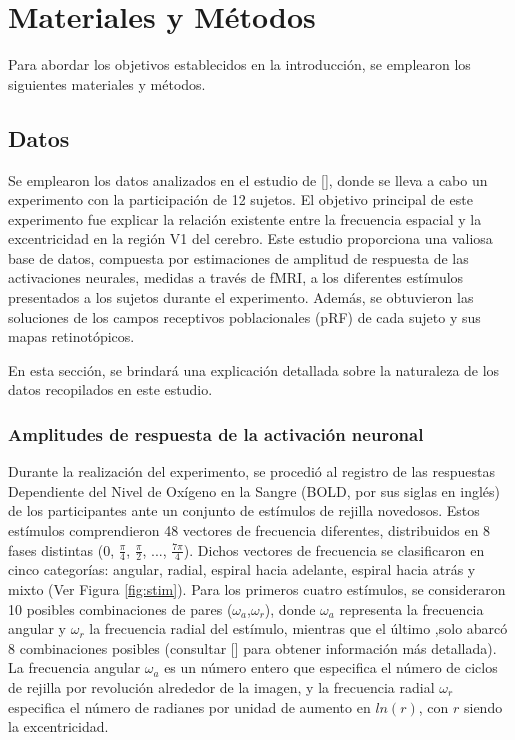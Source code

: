 \chapter{Materiales y M\'etodos}\label{chapter:materials_and_methods}

Para abordar los objetivos establecidos en la introducción, se emplearon los siguientes materiales y métodos.

\section{Datos}

Se emplearon los datos analizados en el estudio de [\cite{broderick_mapping_2022}], donde se lleva a cabo un experimento con la participación de 12 sujetos. El objetivo principal de este experimento fue explicar la relación existente entre la frecuencia espacial y la excentricidad en la región V1 del cerebro. Este estudio proporciona una valiosa base de datos, compuesta por estimaciones de amplitud de respuesta de las activaciones neurales, medidas a trav\'es de fMRI, a los diferentes estímulos presentados a los sujetos durante el experimento. Además, se obtuvieron las soluciones de los campos receptivos poblacionales (pRF) de cada sujeto y sus mapas retinot\'opicos.

En esta sección, se brindará una explicación detallada sobre la naturaleza de los datos recopilados en este estudio.

\subsection{Amplitudes de respuesta de la activaci\'on neuronal}

Durante la realización del experimento, se procedió al registro de las respuestas Dependiente del Nivel de Oxígeno en la Sangre (BOLD, por sus siglas en ingl\'es) de los participantes ante un conjunto de est\'imulos de rejilla novedosos. Estos estímulos comprendieron 48 vectores de frecuencia diferentes, distribuidos en 8 fases distintas (0, $\frac{\pi}{4}$, $\frac{\pi}{2}$, ..., $\frac{7\pi}{4}$). Dichos vectores de frecuencia se clasificaron en cinco categorías: angular, radial, espiral hacia adelante, espiral hacia atrás y mixto  (Ver Figura \ref{fig:stim}). Para los primeros cuatro estímulos, se consideraron 10 posibles combinaciones de pares ($\omega_a$,$\omega_r$), donde $\omega_a$ representa la frecuencia angular y $\omega_r$ la frecuencia radial del estímulo, mientras que el último ,solo abarcó 8 combinaciones posibles (consultar [\cite{broderick_mapping_2022}] para obtener información más detallada). La frecuencia angular $\omega_a$ es un número entero que especifica el número de ciclos de rejilla por revolución alrededor de la imagen, y la frecuencia radial $\omega_r$ especifica el número de radianes por unidad de aumento en $ln(r)$, con $r$ siendo la excentricidad.

